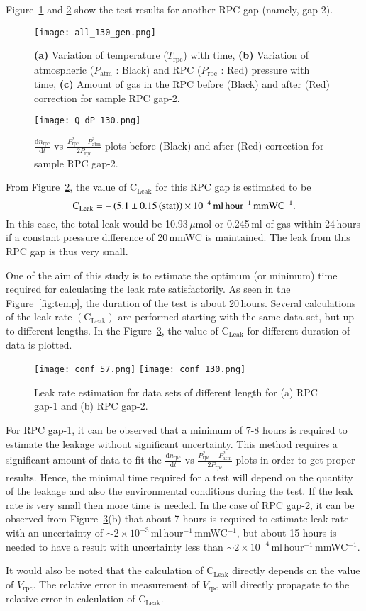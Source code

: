 Figure~\ref{fig:with1} and \ref{fig:qt1} show the test results for another RPC gap (namely, gap-2).
\begin{figure}
  \centering
  \texttt{[image: all\_130\_gen.png]}
  \caption{\textbf{(a)} Variation of temperature ($T_{\textrm{rpc}}$) with time, \textbf{(b)} Variation of atmospheric ($P_{\textrm{atm}}$ : Black) and RPC ($P_{\textrm{rpc}}$ : Red) pressure with time, \textbf{(c)} Amount of gas in the RPC before (Black) and after (Red) correction for sample RPC gap-2.}
  \label{fig:with1}
\end{figure}
\begin{figure}
  \centering
  \texttt{[image: Q\_dP\_130.png]}
  \caption{$\frac{\mathrm{d}n_{\textrm{rpc}}}{\mathrm{d}t}$ vs $\frac{P_{\textrm{rpc}}^{2}-P_{\textrm{atm}}^{2}}{2P_{\textrm{rpc}}}$ plots before (Black) and after (Red) correction for sample RPC gap-2.}
  \label{fig:qt1}
\end{figure}
From Figure~\ref{fig:qt1}, the value of $\textrm{C}_{\textrm{Leak}}$ for this RPC gap is estimated to be
\[\textrm{C}_{\textrm{Leak}}=-\left(5.1\pm 0.15\left(\textrm{stat}\right)\right)\times 10^{-4}\textrm{\,ml\,hour$^{-1}$\,mmWC$^{-1}$}.\]
In this case, the total leak would be 10.93\,$\mu$mol or 0.245\,ml of gas within 24\,hours if a constant pressure difference of 20\,mmWC is maintained. The leak from this RPC gap is thus very small.

One of the aim of this study is to estimate the optimum (or minimum) time required for calculating the leak rate satisfactorily. As seen in the Figure~\ref{fig:temp}, the duration of the test is about 20\,hours. Several calculations of the leak rate $\left(\textrm{C}_{\textrm{Leak}}\right)$ are performed starting with the same data set, but up-to different lengths. In the Figure~\ref{fig:time}, the value of $\textrm{C}_{\textrm{Leak}}$ for different duration of data is plotted.
\begin{figure}
  \centering
  \texttt{[image: conf\_57.png]}
  \vspace*{10pt}
  \texttt{[image: conf\_130.png]}
  \caption{Leak rate estimation for data sets of different length for (a) RPC gap-1 and (b) RPC gap-2.}
  \label{fig:time}
\end{figure}
For RPC gap-1, it can be observed that a minimum of 7-8 hours is required to estimate the leakage without significant uncertainty. This method requires a significant amount of data to fit the $\frac{\mathrm{d}n_{\textrm{rpc}}}{\mathrm{d}t}$ vs $\frac{P_{\textrm{rpc}}^{2}-P_{\textrm{atm}}^{2}}{2P_{\textrm{rpc}}}$ plots in order to get proper results. Hence, the minimal time required for a test will depend on the quantity of the leakage and also the environmental conditions during the test. If the leak rate is very small then more time is needed. In the case of RPC gap-2, it can be observed from Figure~\ref{fig:time}(b) that about 7 hours is required to estimate leak rate with an uncertainty of $\sim 2\times 10^{-3}$\,ml\,hour$^{-1}$\,mmWC$^{-1}$, but about 15 hours is needed to have a result with uncertainty less than $\sim 2\times 10^{-4}$\,ml\,hour$^{-1}$\,mmWC$^{-1}$.

It would also be noted that the calculation of $\textrm{C}_{\textrm{Leak}}$ directly depends on the value of $V_{\textrm{rpc}}$. The relative error in measurement of $V_{\textrm{rpc}}$ will directly propagate to the relative error in calculation of $\textrm{C}_{\textrm{Leak}}$.
